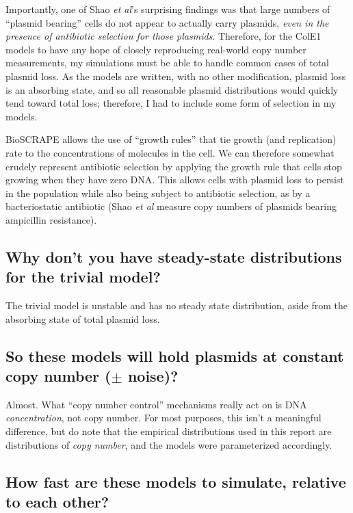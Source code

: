 \documentclass[preprint,12pt]{oldplainarticle}
\begin{document}
Importantly, one of Shao \emph{et al}'s surprising findings was that large numbers of ``plasmid bearing'' cells do not appear to actually carry plasmids, \emph{even in the presence of antibiotic selection for those plasmids}. Therefore, for the ColE1 models to have any hope of closely reproducing real-world copy number measurements, my simulations must be able to handle common cases of total plasmid loss. As the models are written, with no other modification, plasmid loss is an absorbing state, and so all reasonable plasmid distributions would quickly tend toward total loss; therefore, I had to include some form of selection in my models.

BioSCRAPE allows the use of ``growth rules'' that tie growth (and replication) rate to the concentrations of molecules in the cell. We can therefore somewhat crudely represent antibiotic selection by applying the growth rule that cells stop growing when they have zero DNA. This allows cells with plasmid loss to persist in the population while also being subject to antibiotic selection, as by a bacteriostatic antibiotic (Shao \emph{et al} measure copy numbers of plasmids bearing ampicillin resistance). 

\subsection{Why don't you have steady-state distributions for the trivial model?}

The trivial model is unstable and has no steady state distribution, aside from the absorbing state of total plasmid loss. 

\subsection{So these models will hold plasmids at constant copy number ($\pm$ noise)?}

Almost. What ``copy number control'' mechanisms really act on is DNA \emph{concentration}, not copy number. For most purposes, this isn't a meaningful difference, but do note that the empirical distributions used in this report are distributions of \emph{copy number}, and the models were parameterized accordingly.

\subsection{How fast are these models to simulate, relative to each other?}
\end{document}
